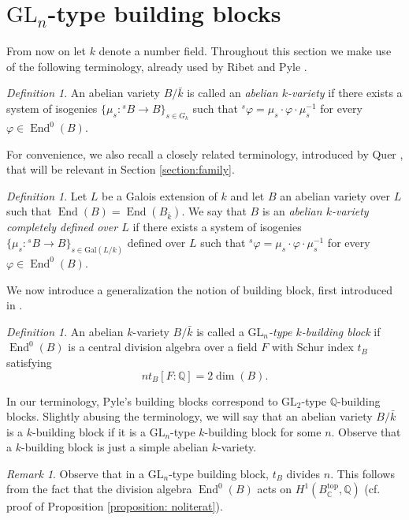 \documentclass[oneside]{amsart}
\theoremstyle{remark}
\newtheorem{remark}[theorem]{Remark}
\newtheorem{definition}[theorem]{Definition}
\newcommand{\ra}{\rightarrow}
\newcommand{\Q}{\mathbb Q}
\newcommand{\kbar}{{\bar{k}}}
\newcommand{\Gal}{\mathrm{Gal}}
\newcommand{\C}{\mathbb C}
\newcommand{\GL}{\mathrm{GL}}
\newcommand{\End}{\operatorname{End}}
\numberwithin{equation}{section}
\begin{document}
\section{$\GL_n$-type building blocks}\label{section: building blocks}

From now on let $k$ denote a number field. Throughout this section we make use of the following terminology, already used by Ribet \cite{Rib92} and Pyle \cite{Pyl04}.

\begin{definition}\label{def:k-variety}
An abelian variety $B/\kbar$ is called an \emph{abelian $k$-variety} if there exists a system of isogenies $\{\mu_s \colon {}^s B \ra B \}_{s\in G_k}$  such that ${}^s\varphi = \mu_s \cdot\varphi \cdot\mu_s^{-1}$ for every $\varphi\in \End^0(B)$.
  \end{definition}
  For convenience, we also recall a closely related terminology, introduced by Quer \cite{Que00}, that will be relevant in Section \ref{section:family}.
  \begin{definition}\label{def: completely defined}
    Let $L$ be a Galois extension of $k$ and let $B$ an abelian variety over $L$ such that $\End(B)=\End(B_\kbar)$. We say that $B$ is an \emph{abelian $k$-variety completely defined over $L$} if there exists a system of isogenies $\{\mu_s \colon {}^s B \ra B \}_{s\in \Gal(L/k)}$ defined over $L$  such that ${}^s\varphi = \mu_s \cdot\varphi \cdot\mu_s^{-1}$ for every $\varphi\in \End^0(B)$.
  \end{definition}

  We now introduce a generalization the notion of building block, first introduced in \cite{Pyl04}.
\begin{definition}\label{def: bb} An abelian $k$-variety $B/\kbar$ is called a \emph{$\mathrm{GL}_n$-type $k$-building block} if  $\End^0(B)$ is a central division algebra over a field $F$ with Schur index $t_B$ satisfying 
$$nt_B[F\colon \Q] = 2\dim(B).$$
\end{definition}
In our terminology, Pyle's building blocks correspond to $\GL_2$-type $\Q$-building blocks. Slightly abusing the terminology, we will say that an abelian variety $B/\kbar$ is a $k$-building block if it is a $\GL_n$-type $k$-building block for some $n$. Observe that a $k$-building block is just a simple abelian $k$-variety.

\begin{remark}
Observe that in a $\GL_n$-type building block, $t_B$ divides $n$. This follows from the fact that the division algebra $\End^0(B)$ acts on $H^1(B_\C^\mathrm{top},\Q)$ (cf. proof of Proposition \ref{proposition: noliterat}).
\end{remark}
\end{document}
